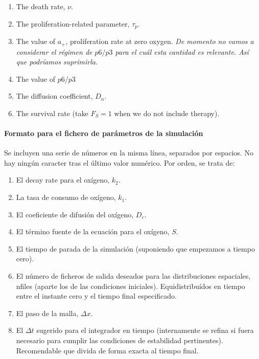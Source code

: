 \documentclass[12pt]{article}
\numberwithin{equation}{section}
\begin{document}
\begin{enumerate}

\item The death rate, $\nu$.

\item The proliferation-related parameter, $\tau_p$.

\item The value of $a_+$, proliferation rate at zero oxygen. {\em De momento no vamos a consi\-derar el r\'egimen de $p6/p3$ para el cu\'al esta cantidad es relevante. As\'i que podr\'iamos suprimirla.}

\item The value of $p6/p3$

\item The diffusion coefficient, $D_n$.

\item The survival rate (take $F_S=1$ when we do not include therapy).


\end{enumerate}


\paragraph{Formato para el fichero de par\'ametros de la simulaci\'on}
Se incluyen una serie de n\'umeros en la misma l\'inea, separados por espacios. No hay ning\'un caracter tras el \'ultimo valor num\'erico. Por orden, se trata de:

\begin{enumerate}

\item El decay rate para el ox\'igeno, $k_2$.

\item La tasa de consumo de ox\'igeno, $k_1$.

\item El coeficiente de difusi\'on del ox\'igeno, $D_c$.

\item El t\'ermino fuente de la ecuaci\'on para el ox\'igeno, $S$.

\item El tiempo de parada de la simulaci\'on (suponiendo que empezamos a tiempo cero).

\item El n\'umero de ficheros de salida deseados para las distribuciones espaciales, nfiles (aparte los de las condiciones iniciales). Equidistribu\'idos en tiempo entre el instante cero y el tiempo final especificado.

\item El paso de la malla, $\Delta x$.

\item El $\Delta t$ sugerido para el integrador en tiempo (internamente se refina si fuera necesario para cumplir las condiciones de estabilidad pertinentes). Recomendable que divida de forma exacta al tiempo final.

\end{enumerate}
\end{document}
